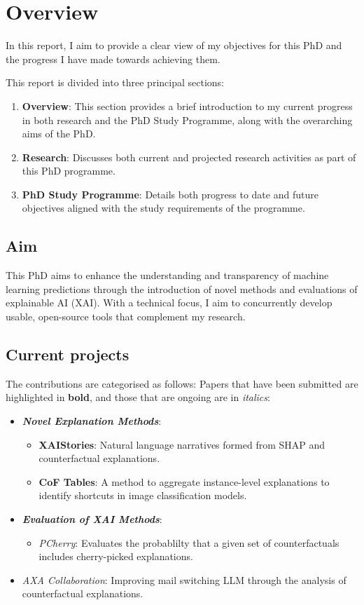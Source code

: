 \section{Overview}

In this report, I aim to provide a clear view of my objectives for this PhD and the progress 
I have made towards achieving them.

This report is divided into three principal sections: 
\begin{enumerate}
    \item \textbf{Overview}: This section provides a brief introduction to my current progress in both research 
    and the PhD Study Programme, along with the overarching aims of the PhD.
    \item \textbf{Research}: Discusses both current and projected research activities as part of this PhD programme.
    \item \textbf{PhD Study Programme}: Details both progress to date and future objectives aligned with the study 
    requirements of the programme.
\end{enumerate}


\subsection*{Aim}

This PhD aims to enhance the understanding and transparency of machine learning predictions through the 
introduction of novel methods and evaluations of explainable AI (XAI). 
With a technical focus, I aim to concurrently develop usable, open-source tools that complement my research.

\subsection*{Current projects}
The contributions are categorised as follows: Papers that have been submitted are highlighted 
in \textbf{bold}, and those that are ongoing are in \textit{italics}:
\begin{itemize}
    \item \textit{\textbf{Novel Explanation Methods}}:
    \begin{itemize}
        \item \textbf{XAIStories}: Natural language narratives formed from SHAP and counterfactual explanations.
        \item \textbf{CoF Tables}: A method to aggregate instance-level explanations to identify shortcuts in 
        image classification models.
    \end{itemize}
    \item \textit{\textbf{Evaluation of XAI Methods}}:
    \begin{itemize}
        \item \textit{PCherry}: Evaluates the probablilty that a given set of counterfactuals includes 
        cherry-picked explanations.
    \end{itemize}
    \item \textit{AXA Collaboration}: Improving mail switching LLM through the analysis of counterfactual explanations.
\end{itemize}

